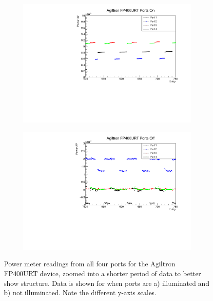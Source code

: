 \documentclass[a4paper,11pt]{article}
\begin{document}
\begin{figure}[h!]
\centering
\begin{subfigure}{0.5\textwidth}
\includegraphics[width=\linewidth]{AgiltronFP400URTPortsOnZoom.pdf}
\subcaption{}\label{fig:agifp400crosstalkon}
\end{subfigure}%
\begin{subfigure}{0.5\textwidth}
\includegraphics[width=\linewidth]{AgiltronFP400URTPortsOffZoom.pdf}
\subcaption{}\label{fig:agifp400crosstalkoff}
\end{subfigure}
\caption{Power meter readings from all four ports for the Agiltron FP400URT device, zoomed into a shorter period of data to better show structure. Data is shown for when ports are a) illuminated and b) not illuminated. Note the different y-axis scales.}\label{fig:agifp400crosstalk}
\end{figure}
\end{document}
